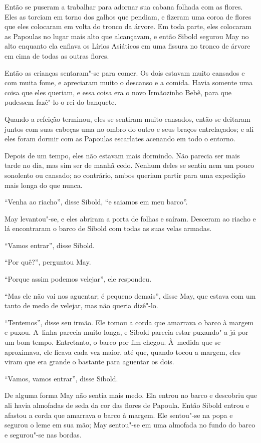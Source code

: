 Então se puseram a trabalhar para adornar sua cabana folhada com as
flores. Eles as torciam em torno dos galhos que pendiam, e fizeram uma
coroa de flores que eles colocaram em volta do tronco da árvore. Em toda
parte, eles colocaram as Papoulas no lugar mais alto que alcançavam, e
então Sibold segurou May no alto enquanto ela enfiava os Lírios
Asiáticos em uma fissura no tronco de árvore em cima de todas as outras
flores.

Então as crianças sentaram"-se para comer. Os dois estavam muito cansados
e com muita fome, e apreciaram muito o descanso e a comida. Havia
somente uma coisa que eles queriam, e essa coisa era o novo Irmãozinho
Bebê, para que pudessem fazê"-lo o rei do banquete.

Quando a refeição terminou, eles se sentiram muito cansados, então se
deitaram juntos com suas cabeças uma no ombro do outro e seus braços
entrelaçados; e ali eles foram dormir com as Papoulas escarlates
acenando em todo o entorno.
\ \


Depois de um tempo, eles não estavam mais dormindo. Não parecia ser mais
tarde no dia, mas sim ser de manhã cedo. Nenhum deles se sentiu nem um
pouco sonolento ou cansado; ao contrário, ambos queriam partir para uma
expedição mais longa do que nunca.

``Venha ao riacho'', disse Sibold, ``e saiamos em meu barco''.

May levantou"-se, e eles abriram a porta de folhas e saíram. Desceram ao
riacho e lá encontraram o barco de Sibold com todas as suas velas
armadas.

``Vamos entrar'', disse Sibold.

``Por quê?'', perguntou May.

``Porque assim podemos velejar'', ele respondeu.

``Mas ele não vai nos aguentar; é pequeno demais'', disse May, que
estava com um tanto de medo de velejar, mas não queria dizê"-lo.

``Tentemos'', disse seu irmão. Ele tomou a corda que amarrava o barco à
margem e puxou. A~linha parecia muito longa, e Sibold parecia estar
puxando"-a já por um bom tempo. Entretanto, o barco por fim chegou. À~medida que se aproximava, ele ficava cada vez maior, até que, quando
tocou a margem, eles viram que era grande o bastante para aguentar os
dois.

``Vamos, vamos entrar'', disse Sibold.

De alguma forma May não sentia mais medo. Ela entrou no barco e
descobriu que ali havia almofadas de seda da cor das flores de Papoula.
Então Sibold entrou e afastou a corda que amarrava o barco à margem. Ele
sentou"-se na popa e segurou o leme em sua mão; May sentou"-se em uma
almofada no fundo do barco e segurou"-se nas bordas.


